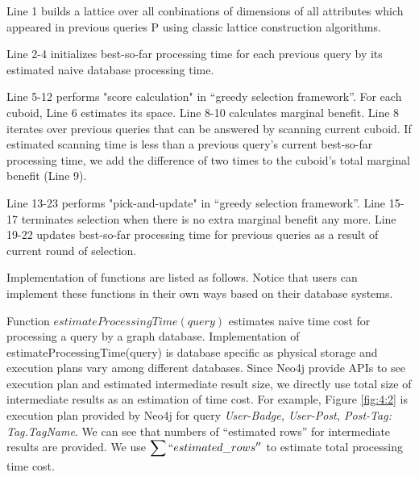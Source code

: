 Line 1 builds a lattice over all conbinations of dimensions of all attributes which appeared in previous queries P using classic lattice construction algorithms.

Line 2-4 initializes best-so-far processing time for each previous query by its estimated naive database processing time.

Line 5-12 performs "score calculation" in ``greedy selection framework''. For each cuboid, Line 6 estimates its space. Line 8-10 calculates marginal benefit. Line 8 iterates over previous queries that can be answered by scanning current cuboid. If estimated scanning time is less than a previous query's current best-so-far processing time, we add the difference of two times to the cuboid's total marginal benefit (Line 9).

Line 13-23 performs "pick-and-update" in ``greedy selection framework''. Line 15-17 terminates selection when there is no extra marginal benefit any more. Line 19-22 updates best-so-far processing time for previous queries as a result of current round of selection.

Implementation of functions are listed as follows. Notice that users can implement these functions in their own ways based on their database systems. 

Function \textbf{$estimateProcessingTime(query)$} estimates naive time cost for processing a query by a graph database. Implementation of estimateProcessingTime(query) is database specific as physical storage and execution plans vary among different databases. Since Neo4j provide APIs to see execution plan and estimated intermediate result size, we directly use total size of intermediate results as an estimation of time cost. For example, Figure \ref{fig:4:2} is execution plan provided by Neo4j for query 
\textit{User-Badge, User-Post, Post-Tag: Tag.TagName}. We can see that numbers of ``estimated rows'' for intermediate results are provided. We use  $\displaystyle{\sum ``estimated\_rows''}$ to estimate total processing time cost.

